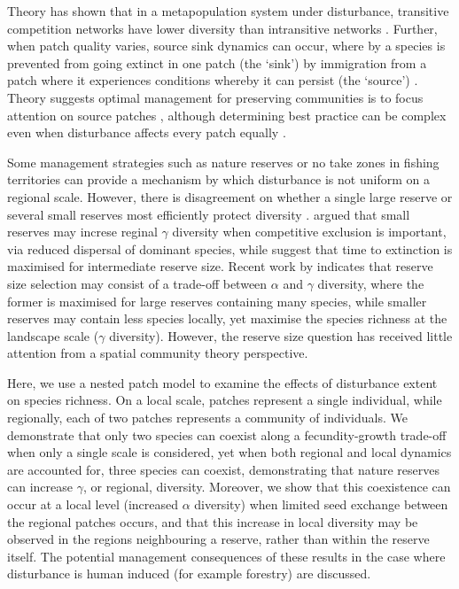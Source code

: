 Theory has shown that in a metapopulation system under disturbance, transitive competition networks have lower diversity than intransitive networks \citep{caswell1991disturbance}. Further, when patch quality varies, source sink dynamics can occur, where by a species is prevented from going extinct in one patch (the `sink') by immigration from a patch where it experiences conditions whereby it can persist (the `source')  \citep{pulliam1988sources}. Theory suggests optimal management for preserving communities is to focus attention on source patches \citep[e.g.][]{runge2006role}, although determining best practice can be complex even when disturbance affects every patch equally \citep{strasser2012contributions}.

Some management strategies such as nature reserves or no take zones in fishing territories can provide a mechanism by which disturbance is not uniform on a regional scale. However, there is disagreement on whether a single large reserve or several small reserves most efficiently protect diversity \citep{simberloff1982refuge}. \cite{simberloff1991nestedness} argued that small reserves may increse reginal $\gamma$ diversity when competitive exclusion is important, via reduced dispersal of dominant species, while \cite{ovaskainen2002long} suggest that time to extinction is maximised for intermediate reserve size. Recent work by \cite{lasky2013reserve} indicates that reserve size selection may consist of a trade-off between $\alpha$ and $\gamma$ diversity, where the former is maximised for large reserves containing many species, while smaller reserves may contain less species locally, yet maximise the species richness at the landscape scale ($\gamma$ diversity). However, the reserve size question has received little attention from a spatial community theory perspective.

Here, we use a nested patch model to examine the effects of disturbance extent on species richness. On a local scale, patches represent a single individual, while regionally, each of two patches represents a community of individuals. We demonstrate that only two species can coexist along a fecundity-growth trade-off when only a single scale is considered, yet when both regional and local dynamics are accounted for, three species can coexist, demonstrating that nature reserves can increase $\gamma$, or regional, diversity. Moreover, we show that this coexistence can occur at a local level (increased $\alpha$ diversity) when limited seed exchange between the regional patches occurs, and that this increase in local diversity may be observed in the regions neighbouring a reserve, rather than within the reserve itself. The potential management consequences of these results in the case where disturbance is human induced (for example forestry) are discussed.



